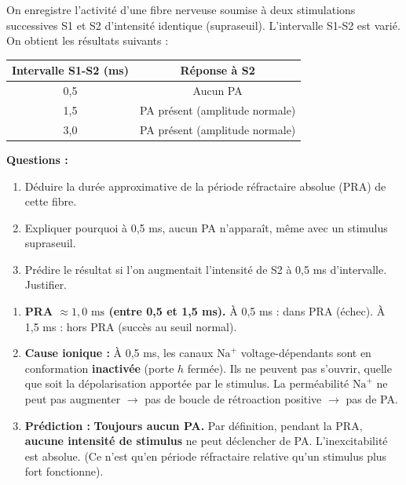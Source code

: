 \documentclass[11pt]{article}
\begin{document}
\begin{exercice}
On enregistre l'activité d'une fibre nerveuse soumise à deux stimulations successives S1 et S2 d'intensité identique (supraseuil). L'intervalle S1-S2 est varié. On obtient les résultats suivants :
\begin{center}
\begin{tabular}{|c|c|}
\hline
Intervalle S1-S2 (ms) & Réponse à S2 \\ \hline
0,5 & Aucun PA \\ \hline
1,5 & PA présent (amplitude normale) \\ \hline
3,0 & PA présent (amplitude normale) \\ \hline
\end{tabular}
\end{center}
\textbf{Questions :}
\begin{enumerate}
    \item Déduire la durée approximative de la période réfractaire absolue (PRA) de cette fibre.
    \item Expliquer pourquoi à 0,5 ms, aucun PA n'apparaît, même avec un stimulus supraseuil.
    \item Prédire le résultat si l'on augmentait l'intensité de S2 à 0,5 ms d'intervalle. Justifier.
\end{enumerate}
\end{exercice}

\begin{corrige}[Exercice n]
\begin{enumerate}
    \item \textbf{PRA $\approx 1,0 \text{ ms}$ (entre 0,5 et 1,5 ms).} À 0,5 ms : dans PRA (échec). À 1,5 ms : hors PRA (succès au seuil normal).
    \item \textbf{Cause ionique :} À 0,5 ms, les canaux $\text{Na}^+$ voltage-dépendants sont en conformation \textbf{inactivée} (porte $h$ fermée). Ils ne peuvent pas s'ouvrir, quelle que soit la dépolarisation apportée par le stimulus. La perméabilité $\text{Na}^+$ ne peut pas augmenter $\to$ pas de boucle de rétroaction positive $\to$ pas de PA.
    \item \textbf{Prédiction :} \textbf{Toujours aucun PA.} Par définition, pendant la PRA, \textbf{aucune intensité de stimulus} ne peut déclencher de PA. L'inexcitabilité est absolue. (Ce n'est qu'en période réfractaire relative qu'un stimulus plus fort fonctionne).
\end{enumerate}
\end{corrige}
\end{document}
